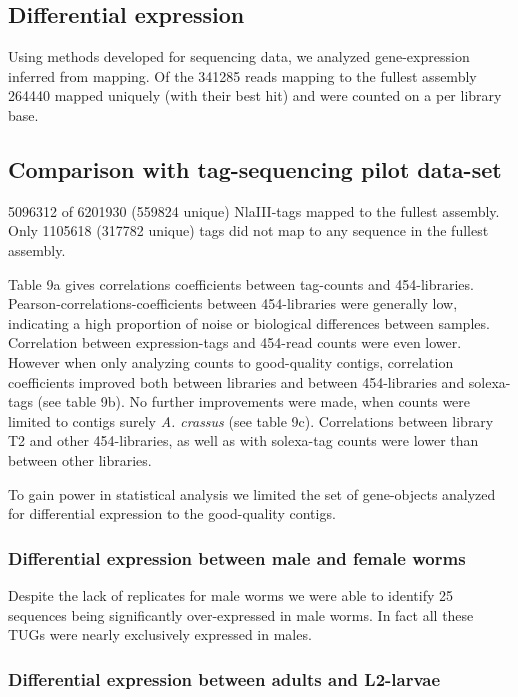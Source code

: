 \documentclass[10pt]{bmc_article}
\newenvironment{bmcformat}{\begin{raggedright}\baselineskip20pt\sloppy\setboolean{publ}{false}}{\end{raggedright}\baselineskip20pt\sloppy}
\begin{document}
\begin{bmcformat}
\subsection*{Differential expression}
                

Using methods developed for sequencing data, we analyzed
gene-expression inferred from mapping. Of the 341285 reads
mapping to the fullest assembly 264440 mapped uniquely
(with their best hit) and were counted on a per library base.

\subsection*{Comparison with tag-sequencing pilot data-set}


5096312 of 6201930 (559824 unique) NlaIII-tags
mapped to the fullest assembly. Only 1105618
(317782 unique) tags did not map to any sequence in the
fullest assembly.

Table 9a gives correlations coefficients between tag-counts and
454-libraries. Pearson-correlations-coefficients between 454-libraries
were generally low, indicating a high proportion of noise or
biological differences between samples. Correlation between
expression-tags and 454-read counts were even lower. However when only
analyzing counts to good-quality contigs, correlation coefficients
improved both between libraries and between 454-libraries and
solexa-tags (see table 9b). No further improvements were made, when
counts were limited to contigs surely \textit{A. crassus} (see table
9c). Correlations between library T2 and other 454-libraries, as well
as with solexa-tag counts were lower than between other libraries.  

To gain power in statistical analysis we limited the set of
gene-objects analyzed for differential expression to the good-quality
contigs.

\subsubsection*{Differential expression between male and female worms}

Despite the lack of replicates for male worms we were able to identify
25 sequences being significantly
over-expressed in male worms. In fact all these TUGs were nearly
exclusively expressed in males. 

\subsubsection*{Differential expression between adults and L2-larvae}


\end{bmcformat}
\end{document}
